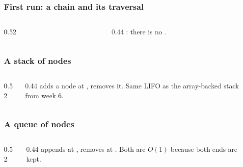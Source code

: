 \documentclass[aspectratio=169,10pt,compress]{beamer}
\begin{document}
\begin{frame}[t,fragile] \frametitle{First run: a chain and its traversal}
  \begin{columns}[T]
    \begin{column}{0.52\textwidth}
    \end{column}
    \begin{column}{0.44\textwidth}
      \small
      : there is no .
    \end{column}
  \end{columns}
\end{frame}




\begin{frame}[t,fragile] \frametitle{A stack of nodes}
  \begin{columns}[T]
    \begin{column}{0.52\textwidth}
    \end{column}
    \begin{column}{0.44\textwidth}
      \small
       adds a node at ,  removes it.
      Same LIFO as the array-backed stack from week 6.
    \end{column}
  \end{columns}
\end{frame}




\begin{frame}[t,fragile] \frametitle{A queue of nodes}
  \begin{columns}[T]
    \begin{column}{0.52\textwidth}
    \end{column}
    \begin{column}{0.44\textwidth}
      \small
       appends at ,  removes
      at . Both are $O(1)$ because both ends are kept.
    \end{column}
  \end{columns}
\end{frame}
\end{document}
